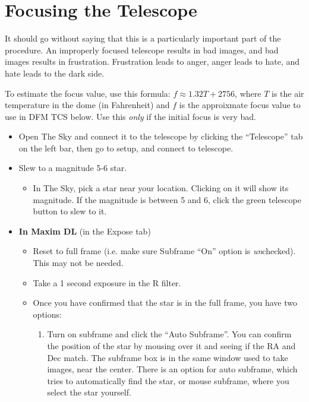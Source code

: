 \documentclass[letterpaper, 12pt]{report}
\begin{document}
\newpage

\chapter{Focusing the Telescope}
\label{ch:focusing}
It should go without saying that this is a particularly important part of the procedure. An improperly focused telescope results in bad images, and bad images results in frustration. Frustration leads to anger, anger leads to hate, and hate leads to the dark side.

To estimate the focus value, use this formula: $f \approx 1.32 T + 2756$, where $T$ is the air temperature in the dome (in Fahrenheit) and $f$ is the approixmate focus value to use in DFM TCS below. Use this \emph{only} if the initial focus is very bad.

\begin{itemize}
	\item Open The Sky and connect it to the telescope by clicking the ``Telescope'' tab on the left bar, then go to setup, and connect to telescope.
	\item Slew to a magnitude 5-6 star.
	\begin{itemize}
		\item In The Sky, pick a star near your location. Clicking on it will show its magnitude. If the magnitude is between 5 and 6, click the green telescope button to slew to it.
	\end{itemize}
	\item {\large \textbf{In Maxim DL} (in the Expose tab)}
	\begin{itemize}
		\item Reset to full frame (i.e. make sure Subframe ``On'' option is \emph{un}checked). This may not be needed.
		\item Take a 1 second exposure in the R filter.
	\end{itemize}
	\begin{itemize}
		\item Once you have confirmed that the star is in the full frame, you have two options:
		\begin{enumerate}
			\item Turn on subframe and click the ``Auto Subframe''. You can confirm the position of the star by mousing over it and seeing if the RA and Dec match. The subframe box is in the same window used to take images, near the center. There is an option for auto subframe, which tries to automatically find the star, or mouse subframe, where you select the star yourself.

\end{enumerate}
\end{itemize}
\end{itemize}
\end{document}
